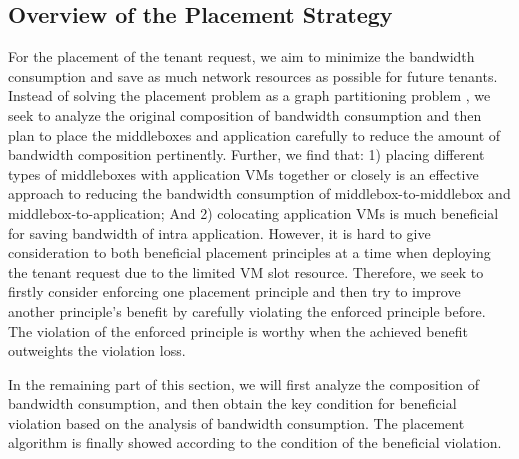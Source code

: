 \documentclass[review]{elsarticle}
\begin{document}

\subsection{Overview of the Placement Strategy}%
For the placement of the tenant request, we aim to minimize the bandwidth consumption and save as much network resources as possible for future tenants. Instead of solving the placement problem as a graph partitioning problem \cite{stratos12}, we seek to analyze the original composition of bandwidth consumption and then plan to place the middleboxes and application carefully to reduce the amount of bandwidth composition pertinently.
Further, we find that: 1) placing different types of middleboxes with application VMs together or closely is an effective approach to reducing the bandwidth consumption of middlebox-to-middlebox and middlebox-to-application; And 2) colocating application VMs is much beneficial for saving bandwidth of intra application. However, it is hard to give consideration to both beneficial placement principles at a time
when deploying the tenant request due to the limited VM slot resource. %
Therefore, we seek to firstly consider enforcing one placement principle and then try to improve another principle's benefit by carefully violating the enforced principle before. %
The violation of the enforced principle is worthy when the achieved benefit outweights the violation loss.

In the remaining part of this section, we will first analyze the composition of bandwidth consumption, and then obtain the key condition for beneficial violation based on the analysis of bandwidth consumption. The placement algorithm is finally showed according to the condition of the beneficial violation.   
 

\end{document}
